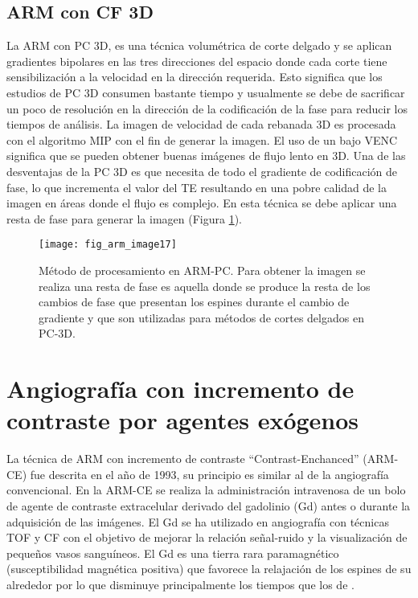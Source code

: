 \subsection{ARM con CF 3D }
La ARM con PC 3D, es una técnica volumétrica de corte delgado y se aplican gradientes bipolares en las tres direcciones del espacio donde cada corte tiene sensibilización a la velocidad en la dirección requerida. Esto significa que los estudios de PC 3D consumen bastante tiempo y usualmente se debe de sacrificar un poco de resolución en la dirección de la codificación de la fase para reducir los tiempos de análisis. La imagen de velocidad de cada rebanada 3D es procesada con el algoritmo MIP con el fin de generar la imagen. El uso de un bajo VENC significa que se pueden obtener buenas imágenes de flujo lento en 3D. Una de las desventajas de la PC 3D es que necesita de todo el gradiente de codificación de fase, lo que incrementa el valor del TE resultando en una pobre calidad de la imagen en áreas donde el flujo es complejo. En esta técnica se debe aplicar una resta de fase para generar la imagen (Figura \ref{fig:arm_image17}). 


\begin{figure}[htbp]
\begin{figg}
 \texttt{[image: fig\_arm\_image17]}
 \caption{
Método de procesamiento en ARM-PC. Para obtener la imagen se realiza una resta de fase es aquella donde se produce la resta de los cambios de fase que presentan los espines durante el cambio de gradiente y que son utilizadas para métodos de cortes delgados en PC-3D.
 }
 \label{fig:arm_image17}
\end{figg}
\end{figure}



\section{Angiografía con incremento de contraste por agentes exógenos}
La técnica de ARM con incremento de contraste ``Contrast-Enchanced'' (ARM-CE) fue descrita en el año de 1993, su principio es similar al de la angiografía convencional. En la ARM-CE se realiza la administración intravenosa de un bolo de agente de contraste extracelular derivado del gadolinio (Gd) antes o durante la adquisición de las imágenes. El Gd se ha utilizado en angiografía con técnicas TOF y CF con el objetivo de mejorar la relación señal-ruido y la visualización de pequeños vasos sanguíneos. El Gd es una tierra rara paramagnético (susceptibilidad magnética positiva) que favorece la relajación de los espines de su alrededor por lo que disminuye principalmente los tiempos \Tone que los de \Ttwo. 


